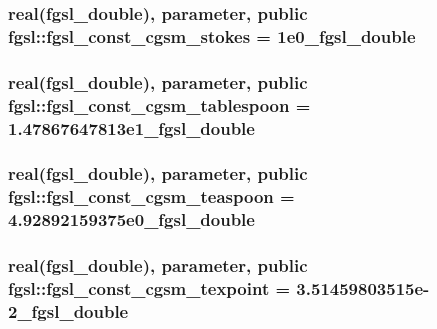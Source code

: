 \hypertarget{classfgsl_a3d38806d98751c252e4450fb1df5b246}{
\subsubsection[{fgsl\-\_\-const\-\_\-cgsm\-\_\-stokes}]{\setlength{\rightskip}{0pt plus 5cm}real({\bf fgsl\-\_\-double}), parameter, public fgsl\-::fgsl\-\_\-const\-\_\-cgsm\-\_\-stokes = 1e0\-\_\-fgsl\-\_\-double}}\label{classfgsl_a3d38806d98751c252e4450fb1df5b246}
\hypertarget{classfgsl_ad8c01acfc1ba5ba62f1c97aa1b0d8142}{
\subsubsection[{fgsl\-\_\-const\-\_\-cgsm\-\_\-tablespoon}]{\setlength{\rightskip}{0pt plus 5cm}real({\bf fgsl\-\_\-double}), parameter, public fgsl\-::fgsl\-\_\-const\-\_\-cgsm\-\_\-tablespoon = 1.\-47867647813e1\-\_\-fgsl\-\_\-double}}\label{classfgsl_ad8c01acfc1ba5ba62f1c97aa1b0d8142}
\hypertarget{classfgsl_a46a096885f2709ea27ce6f1b8f59c279}{
\subsubsection[{fgsl\-\_\-const\-\_\-cgsm\-\_\-teaspoon}]{\setlength{\rightskip}{0pt plus 5cm}real({\bf fgsl\-\_\-double}), parameter, public fgsl\-::fgsl\-\_\-const\-\_\-cgsm\-\_\-teaspoon = 4.\-92892159375e0\-\_\-fgsl\-\_\-double}}\label{classfgsl_a46a096885f2709ea27ce6f1b8f59c279}
\hypertarget{classfgsl_af0bb6a664a268b6db97ed93021e98828}{
\subsubsection[{fgsl\-\_\-const\-\_\-cgsm\-\_\-texpoint}]{\setlength{\rightskip}{0pt plus 5cm}real({\bf fgsl\-\_\-double}), parameter, public fgsl\-::fgsl\-\_\-const\-\_\-cgsm\-\_\-texpoint = 3.\-51459803515e-\/2\-\_\-fgsl\-\_\-double}}\label{classfgsl_af0bb6a664a268b6db97ed93021e98828}

